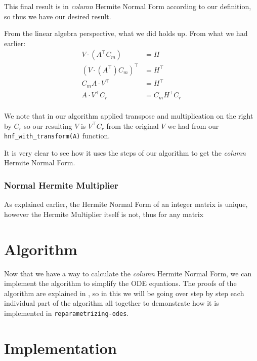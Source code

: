 \documentclass[oneside, a4paper, onecolumn, 11pt]{article}
\begin{document}
This final result is in \textit{column} Hermite Normal Form according to our definition, so thus we have our desired result.

From the linear algebra perspective, what we did holds up. From what we had earlier:
\begin{align*}
    V \cdot (A^\intercal C_m)             & = H                   \\
    (V \cdot (A^\intercal) C_m)^\intercal & = H^\intercal         \\
    C_m A \cdot V^\intercal               & = H^\intercal         \\
    A \cdot V^\intercal C_r               & = C_m H^\intercal C_r \\
\end{align*}

We note that in our algorithm applied transpose and multiplication on the right by \(C_r\) so our resulting \(V\) is \(V^\intercal C_r\) from the original \(V\) we had from our \texttt{hnf\_with\_transform(A)} function.

It is very clear to see how it uses the steps of our algorithm to get the \textit{column} Hermite Normal Form.

\subsubsection{Normal Hermite Multiplier}

As explained earlier, the Hermite Normal Form of an integer matrix is unique, however the Hermite Multiplier itself is not, thus for any matrix


\section{Algorithm}

Now that we have a way to calculate the \textit{column} Hermite Normal Form, we can implement the algorithm to simplify the ODE equations. The proofs of the algorithm are explained in \cite{Hubert2013}, so in this we will be going over step by step each individual part of the algorithm all together to demonstrate how it is implemented in \texttt{reparametrizing-odes}.


\section{Implementation}
\end{document}
